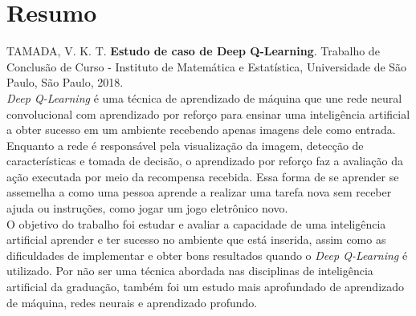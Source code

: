 \chapter*{Resumo}
%
\noindent%
TAMADA, V. K. T. \textbf{Estudo de caso de Deep Q-Learning}. Trabalho de Conclusão de Curso
 - Instituto de Matemática e Estatística, Universidade de São Paulo,
São Paulo, 2018.
\\

\textit{Deep Q-Learning} é uma técnica de aprendizado de máquina que une rede neural convolucional com aprendizado por reforço para ensinar uma inteligência artificial a obter sucesso em um ambiente recebendo apenas imagens dele como entrada.
Enquanto a rede é responsável pela visualização da imagem, detecção de características e tomada de decisão, o aprendizado por reforço faz a avaliação da ação executada por meio da recompensa recebida.
Essa forma de se aprender se assemelha a como uma pessoa aprende a realizar uma tarefa nova sem receber ajuda ou instruções, como jogar um jogo eletrônico novo.
\\

O objetivo do trabalho foi estudar e avaliar a capacidade de uma inteligência artificial aprender e ter sucesso no ambiente que está inserida, assim como as dificuldades de implementar e obter bons resultados quando o \textit{Deep Q-Learning} é utilizado.
Por não ser uma técnica abordada nas disciplinas de inteligência artificial da graduação, também foi um estudo mais aprofundado de aprendizado de máquina, redes neurais e aprendizado profundo.
\\

